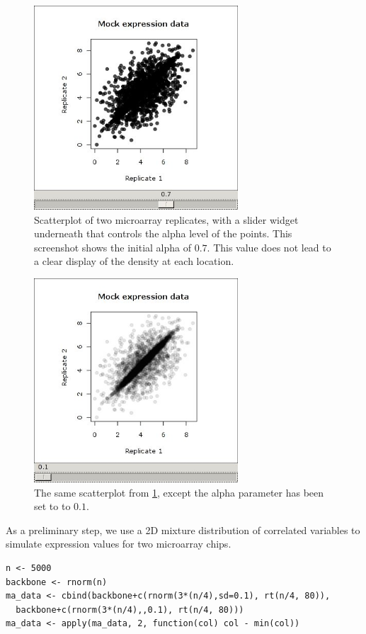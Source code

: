 \documentclass[article]{jss}
\begin{document}
\begin{figure}
\begin{center}
\includegraphics[width=3in]{demo-alpha-random-07-3}
\caption{\label{fig:rgtk2-demo-initial}Scatterplot of two microarray
replicates,
with a slider widget underneath that controls the alpha level of the
points. This screenshot shows the initial alpha of $0.7$.
This value does not lead to a clear display of the density at each
location.
}
\end{center}
\end{figure}

\begin{figure}
\begin{center}
\includegraphics[width=3in]{demo-alpha-random-01-3}
\caption{\label{fig:rgtk2-demo-final}The same scatterplot from 
\ref{fig:rgtk2-demo-initial}, except the alpha parameter has been set to to
$0.1$.}
\end{center}
\end{figure}

As a preliminary step, we use a 2D mixture distribution of correlated
variables to simulate expression values for two microarray chips.
\begin{verbatim}
n <- 5000
backbone <- rnorm(n)
ma_data <- cbind(backbone+c(rnorm(3*(n/4),sd=0.1), rt(n/4, 80)), 
  backbone+c(rnorm(3*(n/4),,0.1), rt(n/4, 80)))
ma_data <- apply(ma_data, 2, function(col) col - min(col))
\end{verbatim}
\end{document}
